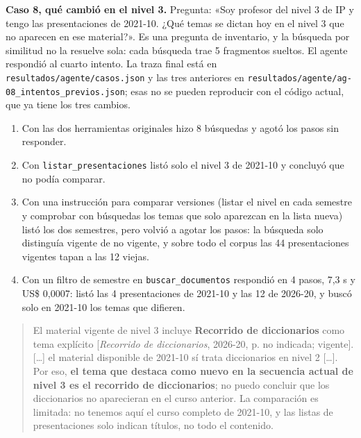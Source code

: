 \documentclass[11pt,letterpaper]{article}
\newcommand{\cod}[1]{\texttt{\small #1}}
\begin{document}
\textbf{Caso 8, qué cambió en el nivel 3.}\label{sec:caso8} Pregunta: «Soy profesor del nivel 3 de IP y tengo las presentaciones de 2021-10. ¿Qué temas se dictan hoy en el nivel 3 que no aparecen en ese material?». Es una pregunta de inventario, y la búsqueda por similitud no la resuelve sola: cada búsqueda trae 5 fragmentos sueltos. El agente respondió al cuarto intento. La traza final está en \cod{resultados/agente/casos.json} y las tres anteriores en \cod{resultados/agente/ag-08\_intentos\_previos.json}; esas no se pueden reproducir con el código actual, que ya tiene los tres cambios.

\begin{enumerate}[leftmargin=1.8em,itemsep=2pt]
\item Con las dos herramientas originales hizo 8 búsquedas y agotó los pasos sin responder.
\item Con \cod{listar\_presentaciones} listó solo el nivel 3 de 2021-10 y concluyó que no podía comparar.
\item Con una instrucción para comparar versiones (listar el nivel en cada semestre y comprobar con búsquedas los temas que solo aparezcan en la lista nueva) listó los dos semestres, pero volvió a agotar los pasos: la búsqueda solo distinguía vigente de no vigente, y sobre todo el corpus las 44 presentaciones vigentes tapan a las 12 viejas.
\item Con un filtro de semestre en \cod{buscar\_documentos} respondió en 4 pasos, 7,3 s y US\$ 0,0007: listó las 4 presentaciones de 2021-10 y las 12 de 2026-20, y buscó solo en 2021-10 los temas que difieren.
\end{enumerate}

\begin{quote}\small
El material vigente de nivel 3 incluye \textbf{Recorrido de diccionarios} como tema explícito [\emph{Recorrido de diccionarios}, 2026-20, p. no indicada; vigente]. [\ldots] el material disponible de 2021-10 sí trata diccionarios en nivel 2 [\ldots]. Por eso, \textbf{el tema que destaca como nuevo en la secuencia actual de nivel 3 es el recorrido de diccionarios}; no puedo concluir que los diccionarios no aparecieran en el curso anterior. La comparación es limitada: no tenemos aquí el curso completo de 2021-10, y las listas de presentaciones solo indican títulos, no todo el contenido.
\end{quote}
\end{document}

